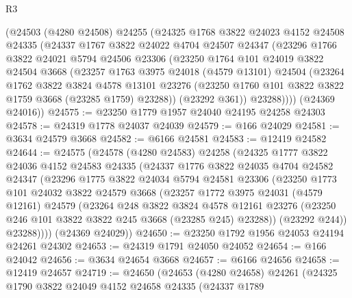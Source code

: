 \begin{lexlean}{R3}
\begin{coremodule}
    (@24503
      (@4280 @24508)
      @24255
      (@24325
        @1768
        @3822
        @24023
        @4152
        @24508
        @24335
        (@24337
          @1767
          @3822
          @24022
          @4704
          @24507
          @24347
          (@23296
            @1766
            @3822
            @24021
            @5794
            @24506
            @23306
            (@23250
              @1764
              @101
              @24019
              @3822
              @24504
              @3668
              (@23257
                @1763
                @3975
                @24018
                (@4579 @13101)
                @24504
                (@23264
                  @1762
                  @3822
                  @3824
                  @4578
                  @13101
                  @23276
                  (@23250 @1760 @101 @3822 @3822 @1759 @3668 (@23285 @1759) @23288))
                (@23292 @361))
              @23288))))
      (@24369 @24016))
@24575 := @23250 @1779 @1957 @24040 @24195 @24258 @24303
@24578 := @24319 @1778 @24037 @24039
@24579 := @166 @24029
@24581 := @3634 @24579 @3668
@24582 := @6166 @24581
@24583 := @12419 @24582
@24644 := @24575
    (@24578
      (@4280 @24583)
      @24258
      (@24325
        @1777
        @3822
        @24036
        @4152
        @24583
        @24335
        (@24337
          @1776
          @3822
          @24035
          @4704
          @24582
          @24347
          (@23296
            @1775
            @3822
            @24034
            @5794
            @24581
            @23306
            (@23250
              @1773
              @101
              @24032
              @3822
              @24579
              @3668
              (@23257
                @1772
                @3975
                @24031
                (@4579 @12161)
                @24579
                (@23264
                  @248
                  @3822
                  @3824
                  @4578
                  @12161
                  @23276
                  (@23250 @246 @101 @3822 @3822 @245 @3668 (@23285 @245) @23288))
                (@23292 @244))
              @23288))))
      (@24369 @24029))
@24650 := @23250 @1792 @1956 @24053 @24194 @24261 @24302
@24653 := @24319 @1791 @24050 @24052
@24654 := @166 @24042
@24656 := @3634 @24654 @3668
@24657 := @6166 @24656
@24658 := @12419 @24657
@24719 := @24650
    (@24653
      (@4280 @24658)
      @24261
      (@24325
        @1790
        @3822
        @24049
        @4152
        @24658
        @24335
        (@24337
          @1789

\end{coremodule}
\end{lexlean}
